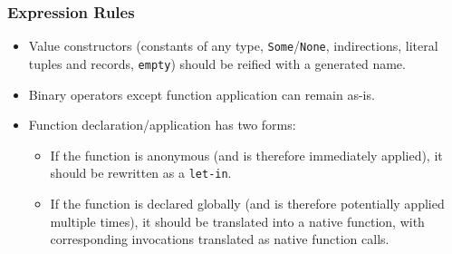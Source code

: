 \documentclass{article}
\begin{document}
    \subsubsection{Expression Rules}

    \begin{itemize}
        \item Value constructors (constants of any type, \texttt{Some}/\texttt{None}, indirections,
            literal tuples and records, \texttt{empty}) should be reified with a generated name.
        \item Binary operators except function application can remain as-is.
        \item Function declaration/application has two forms:
            \begin{itemize}
                \item If the function is anonymous (and is therefore immediately applied), it should
                    be rewritten as a \texttt{let-in}.
                \item If the function is declared globally (and is therefore potentially applied
                    multiple times), it should be translated into a native function, with
                    corresponding invocations translated as native function calls.
            \end{itemize}
    \end{itemize}
\end{document}

